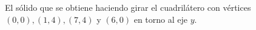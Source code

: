 \item El sólido que se obtiene haciendo girar el cuadrilátero con vértices $(0, 0), (1, 4), (7, 4)$ y $(6, 0)$ en torno al eje $y$.
